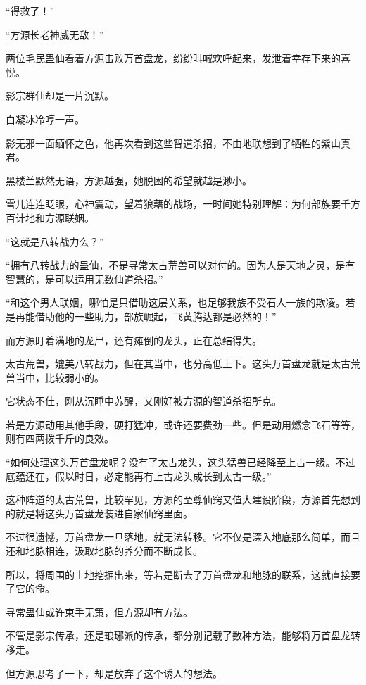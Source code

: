 
\begin{this_body}

“得救了！”

“方源长老神威无敌！”

两位毛民蛊仙看着方源击败万首盘龙，纷纷叫喊欢呼起来，发泄着幸存下来的喜悦。

影宗群仙却是一片沉默。

白凝冰冷哼一声。

影无邪一面缅怀之色，他再次看到这些智道杀招，不由地联想到了牺牲的紫山真君。

黑楼兰默然无语，方源越强，她脱困的希望就越是渺小。

雪儿连连眨眼，心神震动，望着狼藉的战场，一时间她特别理解：为何部族要千方百计地和方源联姻。

“这就是八转战力么？”

“拥有八转战力的蛊仙，不是寻常太古荒兽可以对付的。因为人是天地之灵，是有智慧的，是可以运用无数仙道杀招。”

“和这个男人联姻，哪怕是只借助这层关系，也足够我族不受石人一族的欺凌。若是再能借助他的一些助力，部族崛起，飞黄腾达都是必然的！”

而方源盯着满地的龙尸，还有瘫倒的龙头，正在总结得失。

太古荒兽，媲美八转战力，但在其当中，也分高低上下。这头万首盘龙就是太古荒兽当中，比较弱小的。

它状态不佳，刚从沉睡中苏醒，又刚好被方源的智道杀招所克。

若是方源动用其他手段，硬打猛冲，或许还要费劲一些。但是动用燃念飞石等等，则有四两拨千斤的良效。

“如何处理这头万首盘龙呢？没有了太古龙头，这头猛兽已经降至上古一级。不过底蕴还在，假以时日，必定能再有上古龙头成长到太古一级。”

这种阵道的太古荒兽，比较罕见，方源的至尊仙窍又值大建设阶段，方源首先想到的就是将这头万首盘龙装进自家仙窍里面。

不过很遗憾，万首盘龙一旦落地，就无法转移。它不仅是深入地底那么简单，而且还和地脉相连，汲取地脉的养分而不断成长。

所以，将周围的土地挖掘出来，等若是断去了万首盘龙和地脉的联系，这就直接要了它的命。

寻常蛊仙或许束手无策，但方源却有方法。

不管是影宗传承，还是琅琊派的传承，都分别记载了数种方法，能够将万首盘龙转移走。

但方源思考了一下，却是放弃了这个诱人的想法。


\end{this_body}
